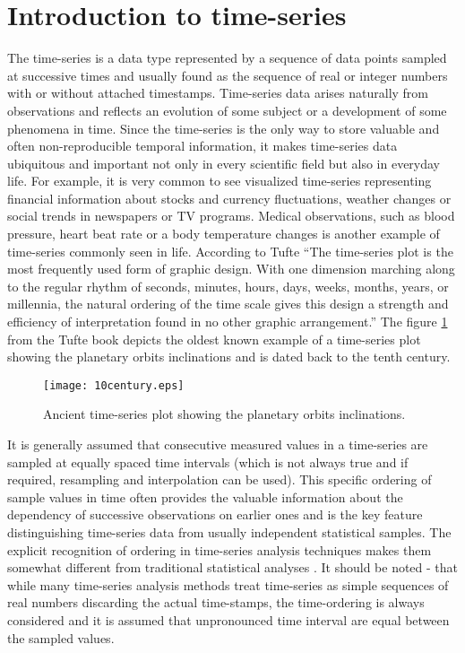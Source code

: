 \section{Introduction to time-series}
The time-series is a data type represented by a sequence of data points sampled at successive times and usually found as the sequence of real or integer numbers with or without attached timestamps. Time-series data arises naturally from observations and reflects an evolution of some subject or a development of some phenomena in time. Since the time-series is the only way to store valuable and often non-reproducible temporal information, it makes time-series data ubiquitous and important not only in every scientific field but also in everyday life. For example, it is very common to see visualized time-series representing financial information about stocks and currency fluctuations, weather changes or social trends in newspapers or TV programs. Medical observations, such as blood pressure, heart beat rate or a body temperature changes is another example of time-series commonly seen in life. According to Tufte \cite{citeulike:1454223} ``The time-series plot is the most frequently used form of graphic design. With one dimension marching along to the regular rhythm of seconds, minutes, hours, days, weeks, months, years, or millennia, the natural ordering of the time scale gives this design a strength and efficiency of interpretation found in no other graphic arrangement.'' The figure \ref{fig:10century} from the Tufte book depicts the oldest known example of a time-series plot showing the planetary orbits inclinations and is dated back to the tenth century.
\begin{figure}[tbp]
   \centering
   \texttt{[image: 10century.eps]}
   \caption{Ancient time-series plot showing the planetary orbits inclinations.}
   \label{fig:10century}
\end{figure} 

It is generally assumed that consecutive measured values in a time-series are sampled at equally spaced time intervals (which is not always true and if required, resampling and interpolation can be used). This specific ordering of sample values in time often provides the valuable information about the dependency of successive observations on earlier ones and is the key feature distinguishing time-series data from usually independent statistical samples. 
The explicit recognition of ordering in time-series analysis techniques makes them somewhat different from traditional statistical analyses \cite{citeulike:3989988}. It should be noted - that while many time-series analysis methods treat time-series as simple sequences of real numbers discarding the actual time-stamps, the time-ordering is always considered and it is assumed that unpronounced time interval are equal between the sampled values.

